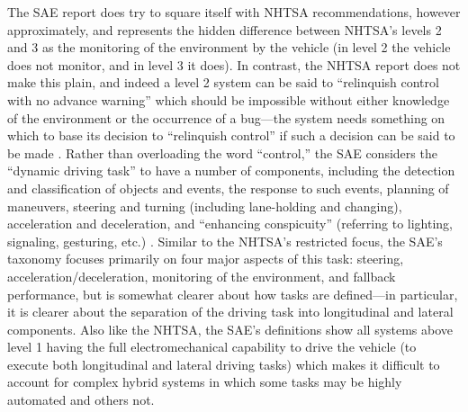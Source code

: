 The SAE report does try to square itself with NHTSA recommendations,
however approximately, and represents the hidden difference between
NHTSA's levels 2 and 3 as the monitoring of the environment by the
vehicle (in level 2 the vehicle does not monitor, and in level 3 it
does). In contrast, the NHTSA report does not make this plain, and
indeed a level 2 system can be said to ``relinquish control with no
advance warning'' which should be impossible without either knowledge of the
environment or the occurrence of a bug---the system needs something on
which to base its decision to ``relinquish control'' if such a decision
can be said to be made \cite[p. 5]{NHTSA}. Rather than overloading the word ``control,''
the SAE considers the ``dynamic driving task'' to have a number of
components, including the detection and classification of objects and
events, the response to such events, planning of maneuvers, steering
and turning (including lane-holding and changing), acceleration and
deceleration, and ``enhancing conspicuity'' (referring to lighting,
signaling, gesturing, etc.) \cite[p. 6]{SAE}. Similar to the NHTSA's
restricted focus, the SAE's taxonomy 
focuses primarily on four major aspects of this task:
steering, acceleration/deceleration, monitoring of the environment,
and fallback performance, but is somewhat clearer about how tasks are
defined---in particular, it is clearer about the separation of the
driving task into longitudinal and lateral components. Also like the
NHTSA, the SAE's definitions show all systems above level 1 having the
full electromechanical capability to drive the vehicle (to execute
both longitudinal and lateral driving tasks) which makes it difficult
to account for complex hybrid systems in which some tasks may be
highly automated and others not.

